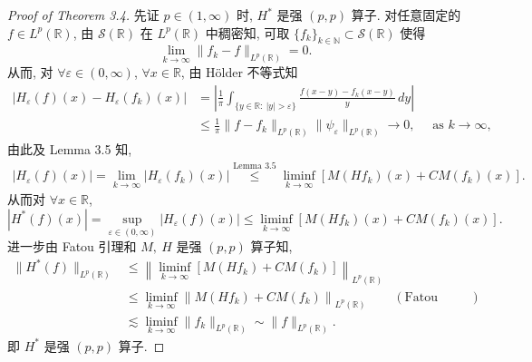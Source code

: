 \documentclass[a4paper,11pt]{article}
\theoremstyle{definition}
\begin{document}
\begin{proof}[Proof of Theorem 3.4]
    先证 $ p \in (1, \infty) $ 时, $ H^* $ 是强 $ (p, p) $ 算子.
    对任意固定的 $ f \in L^p(\mathbb{R}) $, 
    由 $ \mathcal{S}(\mathbb{R}) $ 在 $ L^p(\mathbb{R}) $ 中稠密知, 
    可取 $ \{f_k\}_{k \in \mathbb{N}} \subset \mathcal{S}(\mathbb{R}) $ 使得
    $$
        \lim_{k \to \infty} \| f_k - f \|_{L^p(\mathbb{R})} = 0.
    $$
    从而, 对 $ \forall \varepsilon \in (0, \infty) $, $ \forall x \in \mathbb{R} $, 由 H\"older 不等式知
    \begin{align*} 
       | H_\varepsilon (f) (x) - H_\varepsilon (f_k) (x) |
          &=\left| \frac{1}{\pi} \int_{\{y \in \mathbb{R}:\ |y|>\varepsilon\}} \frac{f(x-y)-f_k(x-y)}{y} \, dy \right| \\
          &\leq \frac{1}{\pi} \| f - f_k \|_{L^p(\mathbb{R})} \| \psi_\varepsilon \|_{L^p(\mathbb{R})}
          \to 0, \quad \text{ as }  k \to \infty,
    \end{align*}
    由此及 Lemma 3.5 知,
    \begin{align*}
        | H_\varepsilon (f) (x)|
            = \lim_{k \to \infty} | H_\varepsilon (f_k) (x) |
            \overset{\text{Lemma 3.5}}{\leq} \liminf_{k \to \infty} [M(Hf_k)(x)  + C M (f_k) (x)].
    \end{align*}
    从而对 $ \forall x \in \mathbb{R} $,
    $$
        | H^* (f) (x)| = \sup_{\varepsilon \in (0, \infty)} | H_\varepsilon (f) (x)|
            \leq \liminf_{k \to \infty} [M(Hf_k)(x)  + C M (f_k) (x)].
    $$
    进一步由 Fatou 引理和 $ M,\ H $ 是强 $ (p, p) $ 算子知, 
    \begin{align*}
        \| H^* (f)  \|_{L^p(\mathbb{R})}
            &\leq \left\| \liminf_{k \to \infty} [ M(Hf_k) + C M (f_k) ] \right\|_{L^p(\mathbb{R})} \\
            &\leq \liminf_{k \to \infty}  \left\|  M(Hf_k) + C M (f_k) \right\|_{L^p(\mathbb{R})}
                & (\text{Fatou Lemma}) \\
            &\lesssim \liminf_{k \to \infty} \| f_k  \|_{L^p(\mathbb{R})}
            \sim \| f \|_{L^p(\mathbb{R})}.
    \end{align*}
    即 $ H^* $ 是强 $ (p, p) $ 算子.
    

\end{proof}
\end{document}
